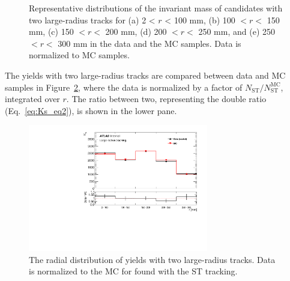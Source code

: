 \begin{figure}[!htb]
    \caption{Representative distributions of the invariant mass of \Ks candidates with two large-radius tracks for (a) 2 < $r$ < 100 mm, (b) 100 $<r<$ 150 mm, (c) 150 $<r<$ 200 mm, (d) 200 $<r<$ 250 mm, and (e) 250 $<r<$ 300 mm in the data and the MC samples. Data is normalized to MC samples.}
    \label{fig:Ks_mass}
\end{figure}

The \Ks yields with two large-radius tracks are compared between data and MC samples in Figure~\ref{fig:Ks_double_ratio}, where the data is normalized by a factor of $N_{\mathrm{ST}} / N_{\mathrm{ST}}^{\mathrm{MC}}$, integrated over $r$. The ratio between two, representing the double ratio (Eq.~\ref{eq:Ks_eq2}), is shown in the lower pane.

\begin{figure}[!htb]
	\includegraphics[width=0.70\textwidth]{figures/m_syst_Ks_ratio_LRT_R.pdf}
	\centering
	\caption{The radial distribution of \Ks yields with two large-radius tracks. Data is normalized to the MC for \Ks found with the ST tracking.} %
	\label{fig:Ks_double_ratio}
\end{figure}

